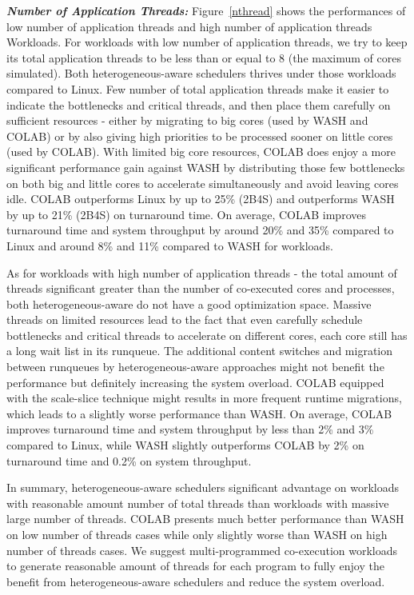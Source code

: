 \textbf{\textit{Number of Application Threads:}}
Figure~\ref{nthread} shows the performances of low number of application threads and high number of application threads Workloads. 
For workloads with low number of application threads, we try to keep its total application threads to be less than or equal to 8 (the maximum of cores simulated). 
Both heterogeneous-aware schedulers thrives  under those workloads compared to Linux. Few number of total application threads make it easier to indicate the bottlenecks and critical threads, and then place them carefully on sufficient resources - either by migrating to big cores (used by WASH and COLAB) or by also giving high priorities to be processed sooner on little cores (used by COLAB). With limited big core resources, COLAB does enjoy a more significant performance gain against WASH by distributing those few bottlenecks on both big and little cores to accelerate simultaneously and avoid leaving cores idle. COLAB outperforms Linux by up to 25\% (2B4S) and outperforms WASH by up to 21\% (2B4S) on turnaround time. On average, COLAB improves turnaround time and system throughput by around 20\% and 35\% compared to Linux and around 8\% and 11\% compared to WASH for workloads.

As for workloads with high number of application threads - the total amount of threads significant greater than the number of co-executed cores and processes, both heterogeneous-aware do not have a good optimization space. Massive threads on limited resources lead to the fact that even carefully schedule bottlenecks and critical threads to accelerate on different cores, each core still has a long wait list in its runqueue. The additional content switches and migration between runqueues by heterogeneous-aware approaches might not benefit the performance but definitely increasing the system overload. COLAB equipped with the scale-slice technique might results in more frequent runtime migrations, which leads to a slightly worse performance than WASH. On average, COLAB improves turnaround time and system throughput by less than 2\% and 3\% compared to Linux, while WASH slightly outperforms COLAB by 2\% on turnaround time and 0.2\% on system throughput.

In summary, heterogeneous-aware schedulers significant advantage on workloads with reasonable amount number of total threads than workloads with massive large number of threads. COLAB presents much better performance than WASH on low number of threads cases while only slightly worse than WASH on high number of threads cases. We suggest multi-programmed co-execution workloads to generate reasonable amount of threads for each program to fully enjoy the benefit from heterogeneous-aware schedulers and reduce the system overload.

